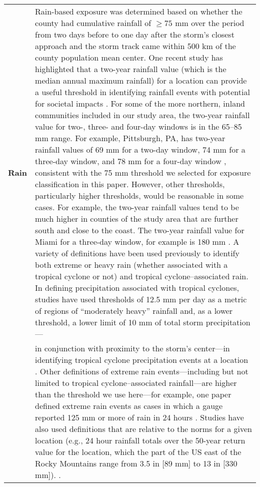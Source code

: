 \begin{longtable}{lp{35em}}
\textbf{Rain} & Rain-based exposure was determined based on whether the county had cumulative rainfall of $\ge75$ mm over the period from two days before to one day after the storm’s closest approach and the storm track came within 500 km of the county population mean center. One recent study has highlighted that a two-year rainfall value (which is the median annual maximum rainfall) for a location can provide a useful threshold in identifying rainfall events with potential for societal impacts \parencite{bosma2020intuitive}. For some of the more northern, inland communities included in our study area, the two-year rainfall value for two-, three- and four-day windows is in the 65--85 mm range. For example, Pittsburgh, PA, has two-year rainfall values of 69 mm for a two-day window, 74 mm for a three-day window, and 78 mm for a four-day window \parencite{noaaatlas}, consistent with the 75 mm threshold we selected for exposure classification in this paper. However, other thresholds, particularly higher thresholds, would be reasonable in some cases. For example, the two-year rainfall values tend to be much higher in counties of the study area that are further south and close to the coast. The two-year rainfall value for Miami for a three-day window, for example is 180 mm \parencite{noaaatlas}. A variety of definitions have been used previously to identify both extreme or heavy rain (whether associated with a tropical cyclone or not) and tropical cyclone--associated rain. In defining precipitation associated with tropical cyclones, studies have used thresholds of 12.5 mm per day as a metric of regions of ``moderately heavy'' rainfall \parencite{zhou2017spatial} and, as a lower threshold, a lower limit of 10 mm of total storm precipitation---\parfillskip=0pt\tabularnewline

&in conjunction with proximity to the storm's center---in identifying tropical cyclone precipitation events at a location \parencite{feldmann2019estimation}. Other definitions of extreme rain events---including but not limited to tropical cyclone--associated rainfall---are higher than the threshold we use here---for example, one paper defined extreme rain events as cases in which a gauge reported 125 mm or more of rain in 24 hours \parencite{schumacher2006characteristics}. Studies have also used definitions that are relative to the norms for a given location (e.g., 24 hour rainfall totals over the 50-year return value for the location, which the part of the US east of the Rocky Mountains range from 3.5 in [89 mm] to 13 in [330 mm]). \parencite{schumacher2006characteristics, schumacher2005organization, stevenson201410}.\\


\end{longtable}
